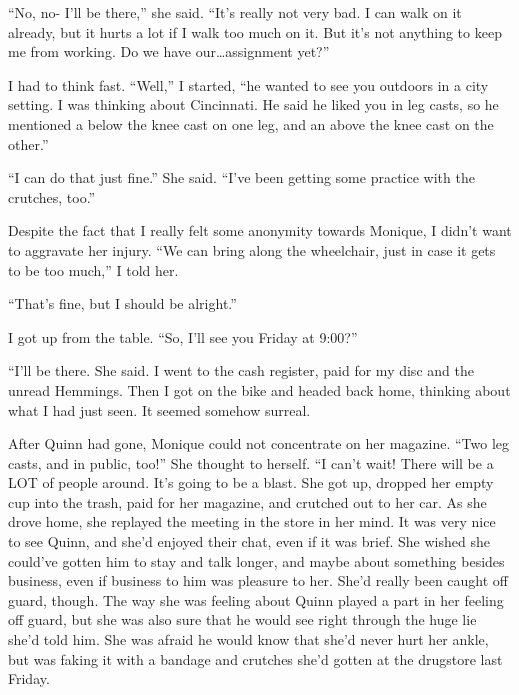 ``No, no- I'll be there,'' she said. ``It's really not very bad. I can walk on it already,
but it hurts a lot if I walk too much on it. But it's not anything to keep me from working. Do
we have our…assignment yet?''

I had to think fast. ``Well,'' I started, ``he wanted to see you outdoors in a city
setting. I was thinking about Cincinnati. He said he liked you in leg casts, so he mentioned a
below the knee cast on one leg, and an above the knee cast on the other.''

``I can do that just fine.'' She said. ``I've been getting some practice with the
crutches, too.''

Despite the fact that I really felt some anonymity towards Monique, I didn't want to
aggravate her injury. ``We can bring along the wheelchair, just in case it gets to be too
much,'' I told her.

``That's fine, but I should be alright.''

I got up from the table. ``So, I'll see you Friday at 9:00?''

``I'll be there. She said.
I went to the cash register, paid for my disc and the unread Hemmings. Then I got on the bike
and headed back home, thinking about what I had just seen. It seemed somehow surreal.

\begin{thought}
After Quinn had gone, Monique could not concentrate on her magazine. ``Two leg casts, and
in public, too!'' She thought to herself. ``I can't wait! There will be a LOT of people around.
It's going to be a blast. She got up, dropped her empty cup into the trash, paid for her
magazine, and crutched out to her car. As she drove home, she replayed the meeting in the store
in her mind. It was very nice to see Quinn, and she'd enjoyed their chat, even if it was brief.
She wished she could've gotten him to stay and talk longer, and maybe about something besides
business, even if business to him was pleasure to her. She'd really been caught off guard,
though. The way she was feeling about Quinn played a part in her feeling off guard, but she was
also sure that he would see right through the huge lie she'd told him. She was afraid he would
know that she'd never hurt her ankle, but was faking it with a bandage and crutches she'd gotten
at the drugstore last Friday.
\end{thought}

